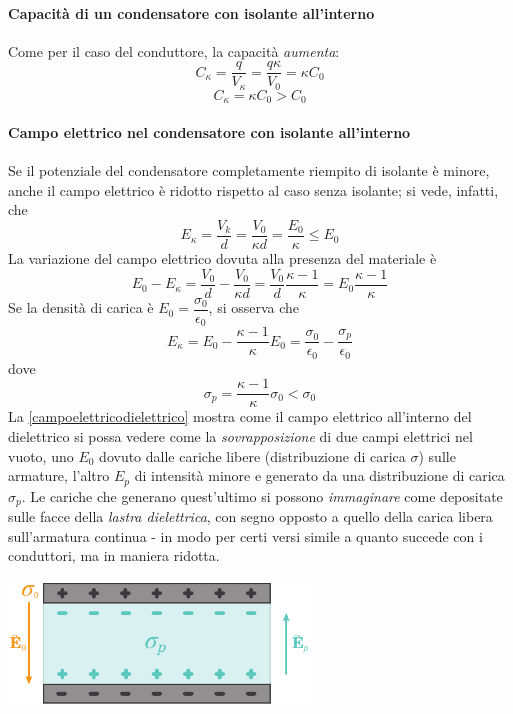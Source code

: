 \paragraph{Capacità di un condensatore con isolante all'interno}
Come per il caso del conduttore, la capacità \textit{aumenta}:
\begin{equation*}
	C_{\kappa}=\frac{q}{V_{\kappa}}=\frac{q\kappa}{V_0}=\kappa C_0
\end{equation*}
\begin{equation}
	C_{\kappa}=\kappa C_0>C_0
\end{equation}
\paragraph{Campo elettrico nel condensatore con isolante all'interno}
Se il potenziale del condensatore completamente riempito di isolante è minore, anche il campo elettrico è ridotto rispetto al caso senza isolante; si vede, infatti, che
\begin{equation*}
	E_{\kappa}=\frac{V_k}{d}=\frac{V_0}{\kappa d}=\frac{E_0}{\kappa}\leq E_0
\end{equation*} 
La variazione del campo elettrico dovuta alla presenza del materiale è
\begin{equation*}
	E_0-E_{\kappa}=\frac{V_0}{d}-\frac{V_0}{\kappa d}=\frac{V_0}{d}\frac{\kappa-1}{\kappa}=E_0\frac{\kappa - 1}{\kappa}
\end{equation*}
Se la densità di carica è $E_0=\dfrac{\sigma_0}{\epsilon_0}$, si osserva che 
\begin{equation}\label{campoelettricodielettrico}
	E_{\kappa}=E_0-\frac{\kappa-1}{\kappa}E_0=\frac{\sigma_0}{\epsilon_0}-\frac{\sigma_p}{\epsilon_0}
\end{equation}
dove
\begin{equation}
	\sigma_p=\frac{\kappa-1}{\kappa}\sigma_0<\sigma_0
\end{equation}
La \eqref{campoelettricodielettrico} mostra come il campo elettrico all'interno del dielettrico si possa vedere come la \textit{sovrapposizione} di due campi elettrici nel vuoto, uno $E_0$ dovuto dalle cariche libere (distribuzione di carica $\sigma$) sulle armature, l'altro $E_p$ di intensità minore e generato da una distribuzione di carica $\sigma_p$. Le cariche che generano quest'ultimo si possono \textit{immaginare} come depositate sulle facce della \textit{lastra dielettrica}, con segno opposto a quello della carica libera sull'armatura continua - in modo per certi versi simile a quanto succede con i conduttori, ma in maniera ridotta.
\begin{center}
	\includegraphics[width=0.6\textwidth]{images/chp6/chp6armaturedielettrico.pdf}
\end{center}
